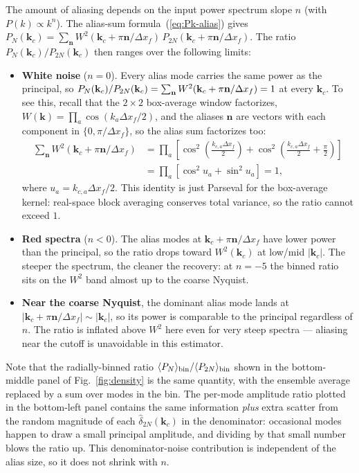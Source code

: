 \documentclass[12pt]{article}
\begin{document}
The amount of aliasing depends on the input power spectrum slope $n$
(with $P(k)\propto k^n$). The alias-sum formula~(\ref{eq:Pk-alias}) gives
$P_N(\mathbf k_c) = \sum_{\mathbf n}W^2(\mathbf k_c+\pi\mathbf
n/\Delta x_f)\,P_{2N}(\mathbf k_c+\pi\mathbf n/\Delta x_f)$. The ratio
$P_N(\mathbf k_c)/P_{2N}(\mathbf k_c)$ then ranges over the following
limits:
\begin{itemize}
\item \textbf{White noise} ($n=0$). Every alias mode carries the same
power as the principal, so
$P_N(\mathbf k_c)/P_{2N}(\mathbf k_c) =
\sum_{\bf n}W^2(\mathbf k_c+\pi\mathbf n/\Delta x_f) = 1$ at every $\mathbf k_c$.
To see this, recall that the $2\times 2$ box-average window factorizes,
$W(\mathbf k)=\prod_{a}\cos(k_a\Delta x_f/2)$, and the aliases
$\mathbf n$ are vectors with each component in $\{0,\pi/\Delta x_f\}$,
so the alias sum factorizes too:
\begin{align*}
\sum_{\mathbf n}W^2(\mathbf k_c+\pi\mathbf n/\Delta x_f)
&= \prod_a\left[\cos^2\!\left(\tfrac{k_{c,a}\Delta x_f}{2}\right)
              +\cos^2\!\left(\tfrac{k_{c,a}\Delta x_f}{2}+\tfrac{\pi}{2}\right)\right] \\
&= \prod_a\left[\cos^2 u_a + \sin^2 u_a\right] = 1,
\end{align*}
where $u_a=k_{c,a}\Delta x_f/2$. This identity is just Parseval for
the box-average kernel: real-space block averaging conserves total
variance, so the ratio cannot exceed $1$.
\item \textbf{Red spectra} ($n<0$). The alias modes at $\mathbf
k_c+\pi\mathbf n/\Delta x_f$ have lower power than the principal, so the ratio
drops toward $W^2(\mathbf k_c)$ at low/mid $|\mathbf k_c|$. The
steeper the spectrum, the cleaner the recovery: at $n=-5$ the
binned ratio sits on the $W^2$ band almost up to the coarse
Nyquist.
\item \textbf{Near the coarse Nyquist}, the dominant alias mode lands
at $|\mathbf k_c+\pi\mathbf n/\Delta x_f|\sim|\mathbf k_c|$, so its power is
comparable to the principal regardless of $n$. The ratio is
inflated above $W^2$ here even for very steep spectra --- aliasing
near the cutoff is unavoidable in this estimator.
\end{itemize}
Note that the radially-binned ratio
$\langle P_N\rangle_{\rm bin}/\langle P_{2N}\rangle_{\rm bin}$ shown
in the bottom-middle panel of Fig.~\ref{fig:density} is the same
quantity, with the ensemble average replaced by a sum over modes in
the bin. The per-mode amplitude ratio plotted in the bottom-left panel
contains the same information \emph{plus} extra scatter from the
random magnitude of
each $\hat\delta_{2N}(\mathbf k_c)$ in the denominator: occasional
modes happen to draw a small principal amplitude, and dividing by
that small number blows the ratio up. This denominator-noise
contribution is independent of the alias size, so it does not shrink
with $n$.
\end{document}
